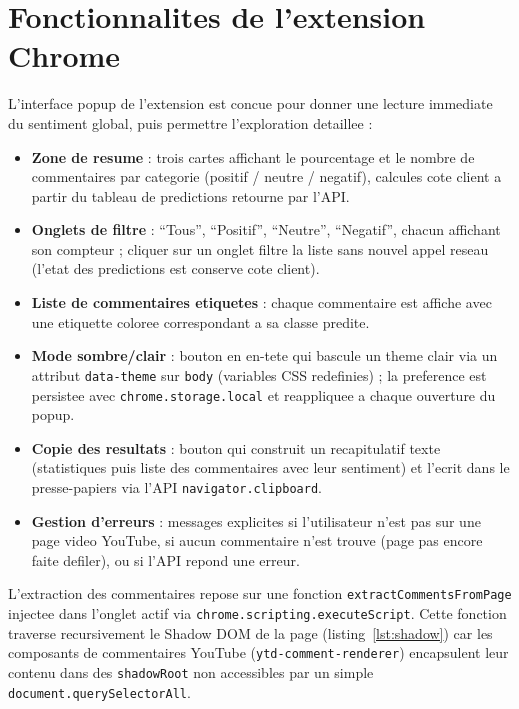 \documentclass[11pt,a4paper]{article}
\begin{document}
\section{Fonctionnalites de l'extension Chrome}

L'interface popup de l'extension est concue pour donner une lecture immediate du sentiment global, puis permettre l'exploration detaillee :

\begin{sloppypar}
\begin{itemize}
  \item \textbf{Zone de resume} : trois cartes affichant le pourcentage et le nombre de commentaires par categorie (positif / neutre / negatif), calcules cote client a partir du tableau de predictions retourne par l'API.
  \item \textbf{Onglets de filtre} : ``Tous'', ``Positif'', ``Neutre'', ``Negatif'', chacun affichant son compteur ; cliquer sur un onglet filtre la liste sans nouvel appel reseau (l'etat des predictions est conserve cote client).
  \item \textbf{Liste de commentaires etiquetes} : chaque commentaire est affiche avec une etiquette coloree correspondant a sa classe predite.
  \item \textbf{Mode sombre/clair} : bouton en en-tete qui bascule un theme clair via un attribut \texttt{data-theme} sur \texttt{body} (variables CSS redefinies) ; la preference est persistee avec \texttt{chrome.storage.local} et reappliquee a chaque ouverture du popup.
  \item \textbf{Copie des resultats} : bouton qui construit un recapitulatif texte (statistiques puis liste des commentaires avec leur sentiment) et l'ecrit dans le presse-papiers via l'API \texttt{navigator.clipboard}.
  \item \textbf{Gestion d'erreurs} : messages explicites si l'utilisateur n'est pas sur une page video YouTube, si aucun commentaire n'est trouve (page pas encore faite defiler), ou si l'API repond une erreur.
\end{itemize}
\end{sloppypar}

L'extraction des commentaires repose sur une fonction \texttt{extractCommentsFromPage} injectee dans l'onglet actif via \texttt{chrome.scripting.executeScript}. Cette fonction traverse recursivement le Shadow DOM de la page (listing~\ref{lst:shadow}) car les composants de commentaires YouTube (\texttt{ytd-comment-renderer}) encapsulent leur contenu dans des \texttt{shadowRoot} non accessibles par un simple \texttt{document.querySelectorAll}.
\end{document}
